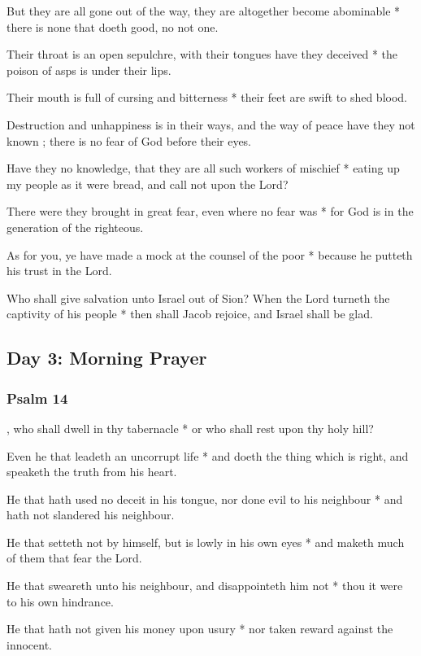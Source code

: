 But they are all gone out of the way, they are altogether become abominable * there is none that doeth good, no not one.

Their throat is an open sepulchre, with their tongues have they deceived * the poison of asps is under their lips.

Their mouth is full of cursing and bitterness * their feet are swift to shed blood.

Destruction and unhappiness is in their ways, and the way of peace have they not known ; there is no fear of God before their eyes.

Have they no knowledge, that they are all such workers of mischief * eating up my people as it were bread, and call not upon the Lord?

There were they brought in great fear, even where no fear was * for God is in the generation of the righteous.

As for you, ye have made a mock at the counsel of the poor * because he putteth his trust in the Lord.

Who shall give salvation unto Israel out of Sion? When the Lord turneth the captivity of his people * then shall Jacob rejoice, and Israel shall be glad.

\subsection{Day 3: Morning Prayer}

\subsubsection{Psalm 14}


, who shall dwell in thy tabernacle * or who shall rest upon thy holy hill?

Even he that leadeth an uncorrupt life * and doeth the thing which is right, and speaketh the truth from his heart.

He that hath used no deceit in his tongue, nor done evil to his neighbour * and hath not slandered his neighbour.

He that setteth not by himself, but is lowly in his own eyes * and maketh much of them that fear the Lord.

He that sweareth unto his neighbour, and disappointeth him not * thou it were to his own hindrance.

He that hath not given his money upon usury * nor taken reward against the innocent.

